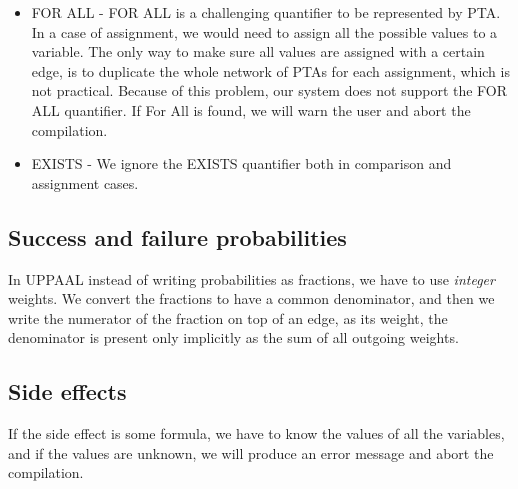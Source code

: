 \begin{itemize}
\item FOR ALL - FOR ALL is a challenging quantifier to be represented by PTA. In a case of assignment, we would need to assign all the possible values to a variable. The only way to make sure all values are assigned with a certain edge, is to duplicate the whole network of PTAs for each assignment, which is not practical. Because of this problem, our system does not support the FOR ALL quantifier. If For All is found, we will warn the user and abort the compilation.
\item EXISTS - We ignore the EXISTS quantifier both in comparison and assignment cases. 
\end{itemize}
\subsection{Success and failure probabilities }
In UPPAAL instead of writing probabilities as fractions, we have to use \textit{integer} weights. We convert the fractions to have a common denominator, and then we write the numerator of the fraction on top of an edge, as its weight, the denominator is present only implicitly as the sum of all outgoing weights. \\
\subsection{Side effects}
If the side effect is some formula, we have to know the values of all the variables, and if the values are unknown, we will produce an error message and abort the compilation.\\
